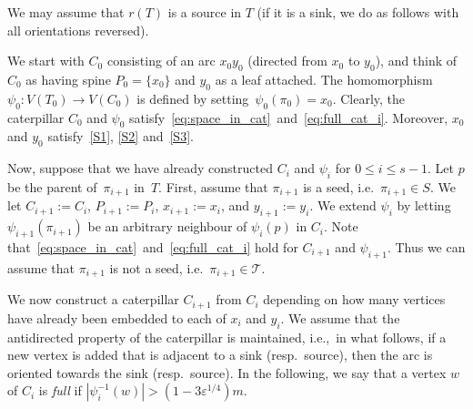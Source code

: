 \documentclass[11pt]{article}
\numberwithin{equation}{section}
\renewcommand{\leq}{\leqslant}
\newcommand{\defi}[1]{\emph{\color{red!50!black}#1}}
\let\eps=\varepsilon
\newcommand{\cT}{\mathcal{T}}
\theoremstyle{definition}
\def\eps{{\varepsilon}}
\begin{document}
We may assume that $r(T)$ is a source in $T$ (if it is a sink, we do as follows with all orientations reversed).

We start with $C_0$ consisting of an arc $x_0y_0$ (directed from $x_0$ to $y_0$), and think of $C_0$ as having spine $P_0 = \{x_0\}$ and $y_0$ as a leaf attached. 
The homomorphism~${\psi_0:V(T_0) \longrightarrow V(C_0)}$ is defined by setting~${\psi_0(\pi_0) = x_0}$.
Clearly, the caterpillar $C_0$ and $\psi_0$ satisfy~\eqref{eq:space_in_cat}~and~\eqref{eq:full_cat_i}.
Moreover, $x_0$ and $y_0$ satisfy~\ref{S1}, \ref{S2} and~\ref{S3}.

Now, suppose that we have already constructed $C_i$ and $\psi_i$ for $0\leq i\leq s-1$. Let $p$ be the parent of~$\pi_{i+1}$ in~$T$.
First, assume that $\pi_{i+1}$ is a seed, i.e.~$\pi_{i+1} \in S$. We let $C_{i+1} := C_i$, $P_{i+1} := P_i$, $x_{i+1} := x_i$,
and $y_{i+1} := y_i$. We extend $\psi_i$ by
letting $\psi_{i+1}(\pi_{i+1})$ be an arbitrary neighbour of $\psi_i(p)$ in $C_i$. Note that~\eqref{eq:space_in_cat}~and~\eqref{eq:full_cat_i}
hold for $C_{i+1}$ and $\psi_{i+1}$. 
Thus we can assume that $\pi_{i+1}$ is not a seed, i.e.~$\pi_{i+1} \in \cT$.

We now construct a caterpillar $C_{i+1}$ from $C_i$ depending on how many vertices have already been embedded to each of $x_i$ and $y_i$. We assume that the antidirected property of the caterpillar is maintained, i.e.,\ in what follows, if a new vertex is added that is adjacent to a sink (resp.\ source), then the arc is oriented towards the sink (resp.\ source). In the following, we say that a vertex $w$ of $C_i$ is
\defi{full} if $|\psi_i^{-1}(w)| > (1-3\eps^{1/4})m$.
\end{document}
